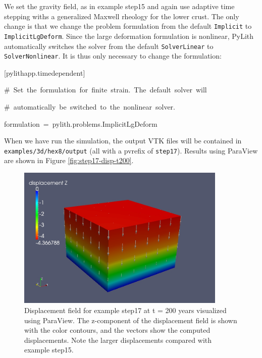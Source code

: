 We set the gravity field, as in example step15 and again use adaptive
time stepping withs a generalized Maxwell rheology for the lower crust.
The only change is that we change the problem formulation from the
default \texttt{Implicit} to \texttt{ImplicitLgDeform}. Since the
large deformation formulation is nonlinear, PyLith automatically switches
the solver from the default \texttt{SolverLinear} to \texttt{SolverNonlinear}.
It is thus only necessary to change the formulation:
\begin{lyxcode}
{[}pylithapp.timedependent{]}

\#~Set~the~formulation~for~finite~strain.~The~default~solver~will

\#~automatically~be~switched~to~the~nonlinear~solver.

formulation~=~pylith.problems.ImplicitLgDeform
\end{lyxcode}
When we have run the simulation, the output VTK files will be contained
in \texttt{examples/3d/hex8/output} (all with a pvrefix of \texttt{step17}).
Results using ParaView are shown in Figure \vref{fig:step17-disp-t200}.

\begin{figure}
\begin{centering}
\includegraphics[width=10cm]{tutorials/3dhex8/figs/step17-displ-t200}
\par\end{centering}

\caption{Displacement field for example step17 at t = 200 years visualized
using ParaView. The z-component of the displacement field is shown
with the color contours, and the vectors show the computed displacements.
Note the larger displacements compared with example step15.\label{fig:step17-disp-t200}}
\end{figure}

